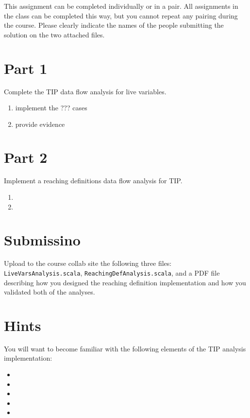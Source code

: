 \documentclass[12pt,letterpaper]{article}
\begin{document}
This assignment can be completed individually or in a pair.  All assignments in the class can be completed this way, but you cannot repeat any pairing during the course.  Please clearly indicate the names of the people submitting the solution on the two attached files.

\section*{Part 1}
Complete the TIP data flow analysis for live variables.
\begin{enumerate}
\item implement the ??? cases
\item provide evidence
\end{enumerate}

\section*{Part 2}
Implement a reaching definitions data flow analysis for TIP.
\begin{enumerate}
\item 
\item
\end{enumerate}

\section*{Submissino} 
Upload to the course collab site the following three files: \texttt{LiveVarsAnalysis.scala}, \texttt{ReachingDefAnalysis.scala}, and a PDF file describing how you designed the reaching definition implementation and how you validated both of the analyses.

\section*{Hints}
You will want to become familiar with the following elements of the TIP analysis implementation:
\begin{itemize}
\item 
\item 
\item 
\item 
\item 
\end{itemize}
\end{document}
